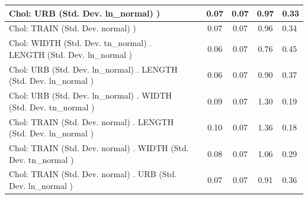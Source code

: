 \begin{table}
\begin{center}
\begin{tabular}{|l|l|c|c|c|l|}
			\hline
			 Chol: URB (Std. Dev. ln_normal) ) &  & 0.07 & 0.07 & 0.97 & 0.33 \\
			\hline
			 Chol: TRAIN (Std. Dev. normal) ) &  & 0.07 & 0.07 & 0.96 & 0.34 \\
			\hline
			 Chol: WIDTH (Std. Dev. tn_normal) . LENGTH (Std. Dev.   ln_normal ) &  & 0.06 & 0.07 & 0.76 & 0.45 \\
			\hline
			 Chol: URB (Std. Dev. ln_normal) . LENGTH (Std. Dev.   ln_normal ) &  & 0.06 & 0.07 & 0.90 & 0.37 \\
			\hline
			 Chol: URB (Std. Dev. ln_normal) . WIDTH (Std. Dev.   tn_normal ) &  & 0.09 & 0.07 & 1.30 & 0.19 \\
			\hline
			 Chol: TRAIN (Std. Dev. normal) . LENGTH (Std. Dev.   ln_normal ) &  & 0.10 & 0.07 & 1.36 & 0.18 \\
			\hline
			 Chol: TRAIN (Std. Dev. normal) . WIDTH (Std. Dev.   tn_normal ) &  & 0.08 & 0.07 & 1.06 & 0.29 \\
			\hline
			 Chol: TRAIN (Std. Dev. normal) . URB (Std. Dev.   ln_normal ) &  & 0.07 & 0.07 & 0.91 & 0.36 \\
			\hline
		\end{tabular}
	\end{center}
\end{table}